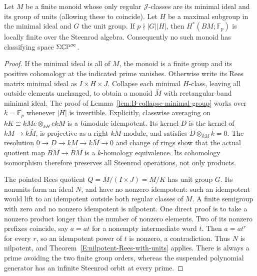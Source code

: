 \begin{corollary}\label{E:two-regular-classes}
Let $M$ be a finite monoid whose only regular $\mathcal J$-classes
are its minimal ideal and its group of units (allowing these to
coincide).  Let $H$ be a maximal subgroup in the minimal ideal and
$G$ the unit group.  If $p\nmid |G||H|$, then
$H^*(BM;\mathbb F_p)$ is locally finite over the Steenrod algebra.
Consequently no such monoid has classifying space
$\Sigma\mathbb {CP}^\infty$.
\end{corollary}

\begin{proof}
If the minimal ideal is all of $M$, the monoid is a finite group and
its positive cohomology at the indicated prime vanishes.  Otherwise
write its Rees matrix minimal ideal as $I\times H\times J$.
Collapse each minimal $H$-class, leaving all outside elements
unchanged, to obtain a monoid $\overline M$ with rectangular-band
minimal ideal.  The proof of
Lemma~\ref{lem:B-collapse-minimal-group} works over $k=\mathbb F_p$
whenever $|H|$ is invertible.  Explicitly, classwise averaging on
$kK\cong kMe\otimes_{kH}ekM$ is a bimodule idempotent.  Its kernel
$D$ is the kernel of $kM\to k\overline M$, is projective as a right
$kM$-module, and satisfies $D\otimes_{kM}k=0$.
The resolution $0\to D\to kM\to k\overline M\to0$ and
change of rings show that the actual quotient map
$BM\to B\overline M$ is a $k$-homology equivalence.  Its cohomology
isomorphism therefore preserves all Steenrod operations, not only
products.

The pointed Rees quotient $Q=\overline M/(I\times J)=M/K$ has
unit group $G$.  Its nonunits form an ideal $N$, and have no
nonzero idempotent: such an idempotent would lift to an idempotent
outside both regular classes of $M$.  A finite semigroup with zero
and no nonzero idempotent is nilpotent.  One direct proof is to take
a nonzero product longer than the number of nonzero elements.
Two of its nonzero prefixes coincide, say $a=at$ for a nonempty
intermediate word $t$.  Then $a=at^r$ for every $r$, so an
idempotent power of $t$ is nonzero, a contradiction.  Thus $N$ is
nilpotent, and Theorem~\ref{E:nilpotent-Rees-with-units} applies.
There is always a prime avoiding the two finite group orders,
whereas the suspended polynomial generator has an infinite
Steenrod orbit at every prime.
\end{proof}
